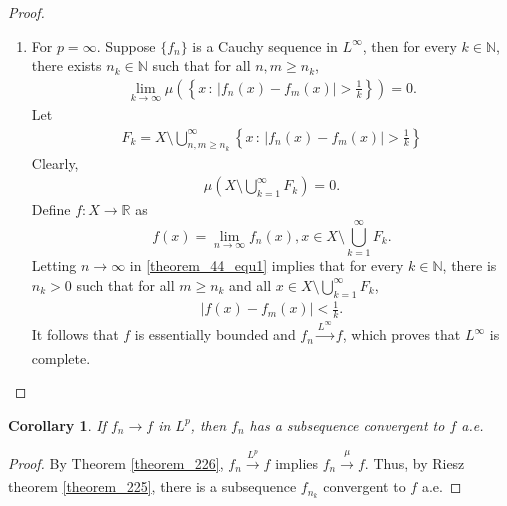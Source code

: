 \documentclass[11pt]{book}
\newtheorem{corollary}{Corollary}[theorem]
\theoremstyle{definition}
\numberwithin{equation}{chapter}
\begin{document}
\begin{proof}
\begin{enumerate}[label=(\alph*)]
    \item For $p = \infty$. Suppose $\{f_n\}$ is a Cauchy sequence in $L^{\infty}$, then for every $k \in \mathbb{N}$, there exists $n_k \in \mathbb{N}$ such that for all $n,m \geq n_k$,
    \begin{align}\label{theorem_44_equ1}
        \lim_{k\to\infty} \mu\left(\left\{x \,:\, \left|f_n(x) - f_m(x)\right| > \frac{1}{k}\right\}\right) = 0.
    \end{align}
    Let
    \begin{align*}
        F_{k} = X \setminus \bigcup^\infty_{n,m \geq n_k}\left\{x \,:\, \left|f_n(x) - f_m(x)\right| > \frac{1}{k}\right\}
    \end{align*}
    Clearly,
    \begin{align*}
        \mu\left(X \setminus \bigcup^\infty_{k=1} F_k\right) = 0.
    \end{align*}
    Define $f: X \to \mathbb{R}$ as 
    $$f(x) = \lim_{n\to\infty} f_n(x), x \in X \setminus \bigcup^\infty_{k=1} F_k.$$
    Letting $n \to \infty$ in \eqref{theorem_44_equ1} implies that for every $k \in \mathbb{N}$, there is $n_k > 0$ such that for all $m \geq n_k$ and all $x \in X \setminus \bigcup^\infty_{k=1} F_k$,
    \begin{align*}
        \left|f(x) - f_m(x)\right| < \frac{1}{k}.
    \end{align*}
    It follows that $f$ is essentially bounded and $f_n \xrightarrow[]{L^\infty} f$, which proves that $L^\infty$ is complete.
\end{enumerate}

\end{proof}

\medskip

\begin{corollary}\label{coro_341}
If $f_n \to f$ in $L^p$, then $f_n$ has a subsequence convergent to $f$ a.e.
\end{corollary}
\begin{proof}
By Theorem \ref{theorem_226}, $f_n \xrightarrow[]{L^p} f$ implies $f_n \xrightarrow[]{\mu} f$. Thus, by Riesz theorem \ref{theorem_225}, there is a subsequence $f_{n_k}$ convergent to $f$ a.e.
\end{proof}

\medskip
\end{document}
